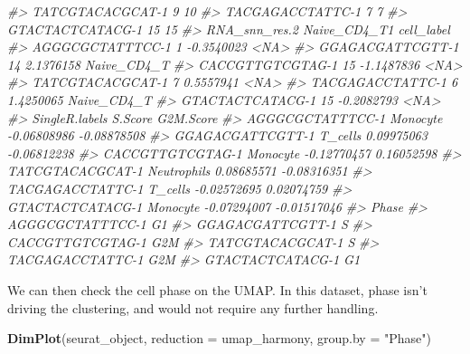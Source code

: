 \documentclass[
]{book}
\newenvironment{Shaded}{\begin{snugshade}}{\end{snugshade}}
\newcommand{\AttributeTok}[1]{\textcolor[rgb]{0.13,0.29,0.53}{#1}}
\newcommand{\CommentTok}[1]{\textcolor[rgb]{0.56,0.35,0.01}{\textit{#1}}}
\newcommand{\FunctionTok}[1]{\textcolor[rgb]{0.13,0.29,0.53}{\textbf{#1}}}
\newcommand{\NormalTok}[1]{#1}
\newcommand{\StringTok}[1]{\textcolor[rgb]{0.31,0.60,0.02}{#1}}
\begin{document}
\begin{Shaded}
\begin{Highlighting}[]
\CommentTok{\#\textgreater{} TATCGTACACGCAT{-}1               9              10}
\CommentTok{\#\textgreater{} TACGAGACCTATTC{-}1               7               7}
\CommentTok{\#\textgreater{} GTACTACTCATACG{-}1              15              15}
\CommentTok{\#\textgreater{}                  RNA\_snn\_res.2 Naive\_CD4\_T1  cell\_label}
\CommentTok{\#\textgreater{} AGGGCGCTATTTCC{-}1             1   {-}0.3540023        \textless{}NA\textgreater{}}
\CommentTok{\#\textgreater{} GGAGACGATTCGTT{-}1            14    2.1376158 Naive\_CD4\_T}
\CommentTok{\#\textgreater{} CACCGTTGTCGTAG{-}1            15   {-}1.1487836        \textless{}NA\textgreater{}}
\CommentTok{\#\textgreater{} TATCGTACACGCAT{-}1             7    0.5557941        \textless{}NA\textgreater{}}
\CommentTok{\#\textgreater{} TACGAGACCTATTC{-}1             6    1.4250065 Naive\_CD4\_T}
\CommentTok{\#\textgreater{} GTACTACTCATACG{-}1            15   {-}0.2082793        \textless{}NA\textgreater{}}
\CommentTok{\#\textgreater{}                  SingleR.labels     S.Score   G2M.Score}
\CommentTok{\#\textgreater{} AGGGCGCTATTTCC{-}1       Monocyte {-}0.06808986 {-}0.08878508}
\CommentTok{\#\textgreater{} GGAGACGATTCGTT{-}1        T\_cells  0.09975063 {-}0.06812238}
\CommentTok{\#\textgreater{} CACCGTTGTCGTAG{-}1       Monocyte {-}0.12770457  0.16052598}
\CommentTok{\#\textgreater{} TATCGTACACGCAT{-}1    Neutrophils  0.08685571 {-}0.08316351}
\CommentTok{\#\textgreater{} TACGAGACCTATTC{-}1        T\_cells {-}0.02572695  0.02074759}
\CommentTok{\#\textgreater{} GTACTACTCATACG{-}1       Monocyte {-}0.07294007 {-}0.01517046}
\CommentTok{\#\textgreater{}                  Phase}
\CommentTok{\#\textgreater{} AGGGCGCTATTTCC{-}1    G1}
\CommentTok{\#\textgreater{} GGAGACGATTCGTT{-}1     S}
\CommentTok{\#\textgreater{} CACCGTTGTCGTAG{-}1   G2M}
\CommentTok{\#\textgreater{} TATCGTACACGCAT{-}1     S}
\CommentTok{\#\textgreater{} TACGAGACCTATTC{-}1   G2M}
\CommentTok{\#\textgreater{} GTACTACTCATACG{-}1    G1}
\end{Highlighting}
\end{Shaded}

We can then check the cell phase on the UMAP. In this dataset, phase isn't driving the clustering, and would not require any further handling.

\begin{Shaded}
\begin{Highlighting}[]
\FunctionTok{DimPlot}\NormalTok{(seurat\_object, }\AttributeTok{reduction =} \StringTok{\textquotesingle{}umap\_harmony\textquotesingle{}}\NormalTok{, }\AttributeTok{group.by =} \StringTok{"Phase"}\NormalTok{)}
\end{Highlighting}
\end{Shaded}
\end{document}
